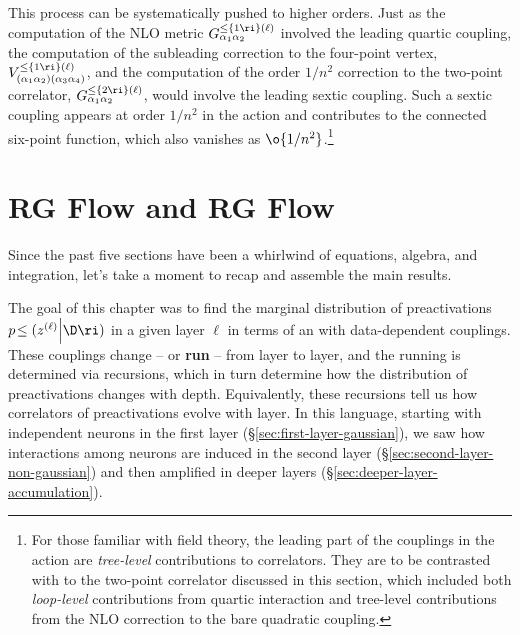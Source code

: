 This process can be systematically pushed to higher orders. Just as the computation of the NLO metric $G_{\alpha_1\alpha_2}^{\le\{1\ri\}(\ell)}$ involved the leading quartic coupling, the computation of the subleading correction to the four-point vertex, $V_{(\alpha_1\alpha_2)(\alpha_3\alpha_4)}^{\le\{1\ri\}(\ell)}$, and the computation of the order $1/n^2$ correction to the two-point correlator, $G_{\alpha_1\alpha_2}^{\le\{2\ri\}(\ell)}$, would involve the leading sextic coupling. Such a sextic coupling appears at order $1/n^2$ in the action and contributes to the connected six-point function, which also vanishes as
$\o{1/n^2}$.\footnote{
For those familiar with field theory, the leading part of the couplings in the action are \emph{tree-level} contributions to correlators.
They are to be contrasted with  to the two-point correlator discussed in this section, which included both \emph{loop-level} contributions from quartic interaction and tree-level contributions from the NLO correction to the bare quadratic coupling.}


\section{RG Flow and RG Flow}
\label{sec:marginalization-group-flow}
Since the past five sections have been a whirlwind of equations, algebra, and integration, let's take a moment to recap and assemble the main results.

The goal of this chapter was to find the marginal distribution of preactivations $p\!\le(z^{(\ell)}\Big\vert\D\ri)$ in a given layer $\ell$  in terms of an  with data-dependent couplings. These couplings change -- or \textbf{run} -- from layer to layer, and the running is determined via recursions, which in turn determine how the distribution of preactivations changes with depth.
Equivalently, these recursions tell us how correlators of preactivations evolve with layer.
In this language, starting with independent neurons in the first layer (\S\ref{sec:first-layer-gaussian}),
we saw how interactions among neurons are induced in the second layer (\S\ref{sec:second-layer-non-gaussian})
and then amplified in deeper layers  (\S\ref{sec:deeper-layer-accumulation}).

